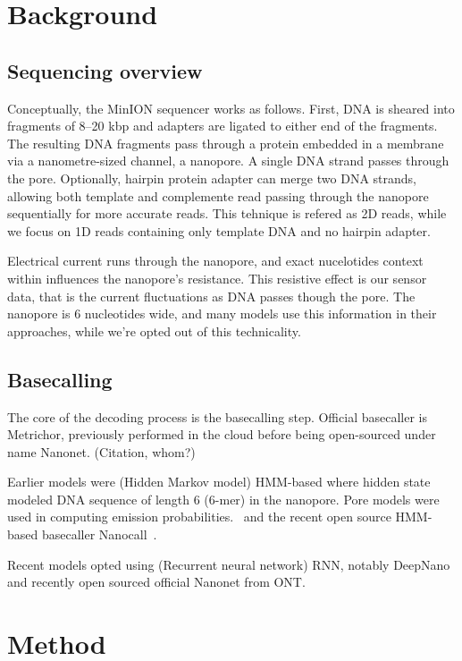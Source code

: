 \documentclass[times, utf8, seminar, numeric]{fer}
\begin{document}
\chapter{Background}

\section{Sequencing overview}
Conceptually, the MinION sequencer works as follows. First, DNA is sheared into fragments of 8–20 kbp and adapters are ligated to either end of the fragments. The resulting DNA fragments pass through a protein embedded in a membrane via a nanometre-sized channel, a nanopore. A single DNA strand passes through the pore. Optionally, hairpin protein adapter can merge two DNA strands, allowing both template and complemente read passing through the nanopore sequentially for more accurate reads. This tehnique is refered as 2D reads, while we focus on 1D reads containing only template DNA and no hairpin adapter.

Electrical current runs through the nanopore, and exact nucelotides context within influences the nanopore's resistance. This resistive effect is our sensor data, that is the current fluctuations as DNA passes though the pore. The nanopore is 6 nucleotides wide, and many models use this information in their approaches, while we're opted out of this technicality.

\section{Basecalling}

The core of the decoding process is the basecalling step. Official basecaller is Metrichor, previously performed in the cloud before being open-sourced under name Nanonet. (Citation, whom?)

Earlier models were (Hidden Markov model) HMM-based where hidden state modeled DNA sequence of length 6 (6-mer) in the nanopore. Pore models were used in computing emission probabilities.~\cite{loman2015complete,schreiber2015analysis,szalay2015novo,timp2012dna} and the recent open source HMM-based basecaller Nanocall~\cite{david2016nanocall}.

Recent models opted using (Recurrent neural network) RNN, notably DeepNano~\cite{deepnano} and recently open sourced official Nanonet from ONT.

\chapter{Method}
\end{document}
